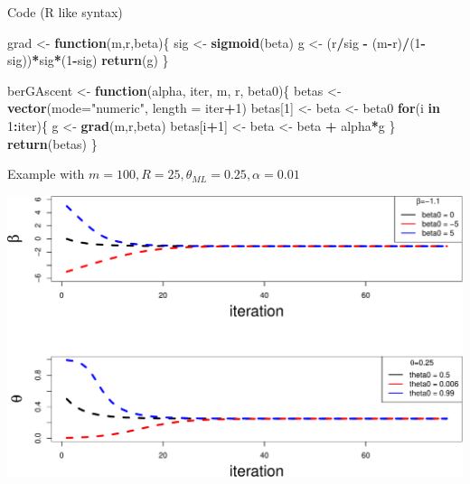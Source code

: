 \documentclass[ignorenonframetext,]{beamer}
\newenvironment{Shaded}{\begin{snugshade}}{\end{snugshade}}
\newcommand{\ControlFlowTok}[1]{\textcolor[rgb]{0.13,0.29,0.53}{\textbf{#1}}}
\newcommand{\DataTypeTok}[1]{\textcolor[rgb]{0.13,0.29,0.53}{#1}}
\newcommand{\DecValTok}[1]{\textcolor[rgb]{0.00,0.00,0.81}{#1}}
\newcommand{\KeywordTok}[1]{\textcolor[rgb]{0.13,0.29,0.53}{\textbf{#1}}}
\newcommand{\NormalTok}[1]{#1}
\newcommand{\OperatorTok}[1]{\textcolor[rgb]{0.81,0.36,0.00}{\textbf{#1}}}
\newcommand{\StringTok}[1]{\textcolor[rgb]{0.31,0.60,0.02}{#1}}
\begin{document}
\begin{frame}[fragile]{Code (R like syntax)}
\protect\hypertarget{code-r-like-syntax}{}

\begin{Shaded}
\begin{Highlighting}[]
\NormalTok{grad <-}\StringTok{ }\ControlFlowTok{function}\NormalTok{(m,r,beta)\{}
\NormalTok{  sig <-}\StringTok{ }\KeywordTok{sigmoid}\NormalTok{(beta)}
\NormalTok{  g <-}\StringTok{ }\NormalTok{(r}\OperatorTok{/}\NormalTok{sig }\OperatorTok{-}\StringTok{ }\NormalTok{(m}\OperatorTok{-}\NormalTok{r)}\OperatorTok{/}\NormalTok{(}\DecValTok{1}\OperatorTok{-}\NormalTok{sig))}\OperatorTok{*}\NormalTok{sig}\OperatorTok{*}\NormalTok{(}\DecValTok{1}\OperatorTok{-}\NormalTok{sig)}
  \KeywordTok{return}\NormalTok{(g)}
\NormalTok{\}}

\NormalTok{berGAscent <-}\StringTok{ }\ControlFlowTok{function}\NormalTok{(alpha, iter, m, r, beta0)\{}
\NormalTok{  betas <-}\StringTok{ }\KeywordTok{vector}\NormalTok{(}\DataTypeTok{mode=}\StringTok{"numeric"}\NormalTok{, }\DataTypeTok{length =}\NormalTok{ iter}\OperatorTok{+}\DecValTok{1}\NormalTok{)}
\NormalTok{  betas[}\DecValTok{1}\NormalTok{] <-}\StringTok{ }\NormalTok{beta <-}\StringTok{ }\NormalTok{beta0}
  \ControlFlowTok{for}\NormalTok{(i }\ControlFlowTok{in} \DecValTok{1}\OperatorTok{:}\NormalTok{iter)\{}
\NormalTok{    g <-}\StringTok{ }\KeywordTok{grad}\NormalTok{(m,r,beta)}
\NormalTok{    betas[i}\OperatorTok{+}\DecValTok{1}\NormalTok{] <-}\StringTok{ }\NormalTok{beta <-}\StringTok{ }\NormalTok{beta }\OperatorTok{+}\StringTok{ }\NormalTok{alpha}\OperatorTok{*}\NormalTok{g}
\NormalTok{  \}}
  \KeywordTok{return}\NormalTok{(betas)}
\NormalTok{\}}
\end{Highlighting}
\end{Shaded}

\end{frame}

\begin{frame}{Example with
\(m=100, R=25, \theta_{ML} = 0.25, \alpha=0.01\)}
\protect\hypertarget{example-with-m100-r25-theta_ml-0.25-alpha0.01}{}

\begin{center}\includegraphics[width=1\linewidth]{lecture4_files/figure-beamer/unnamed-chunk-9-1} \end{center}

\end{frame}
\end{document}
